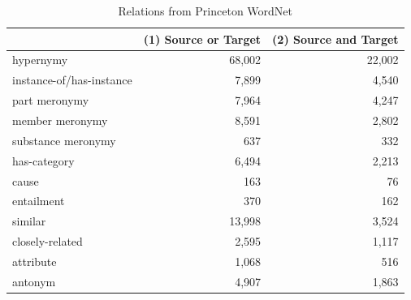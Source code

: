 \documentclass[a4paper,twocolumn]{article}
\begin{document}
\begin{table}[htb]
\begin{center}
\small
\begin{tabular}{lrr}
\hline
                           &  (1) Source or Target  &  (2) Source and Target  \\
\hline
 hypernymy                 &             68,002  &              22,002  \\
 instance-of/has-instance  &              7,899  &               4,540  \\
 part meronymy             &              7,964  &               4,247  \\
 member meronymy           &              8,591  &               2,802  \\
 substance meronymy        &                637  &                 332  \\
 has-category              &              6,494  &               2,213  \\
 cause                     &                163  &                  76  \\
 entailment                &                370  &                 162  \\
 similar                   &             13,998  &               3,524  \\
 closely-related           &              2,595  &               1,117  \\
 attribute                 &              1,068  &                 516  \\
 antonym                   &              4,907  &               1,863  \\
\hline
\end{tabular}
\caption{Relations from Princeton WordNet}\label{tab:rels}
\end{center}
\end{table}
\end{document}
